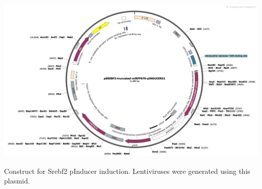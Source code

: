 \begin{suppfigure}[p]  
    \centering
    \includegraphics[width=\linewidth]{figures/hedgehog/SuppFigure14.png}
    \caption[Plasmid design for Srebf2 lentiviral transduction]{
        Construct for Srebf2 pInducer induction. Lentiviruses were generated using this plasmid.  
    }
    \label{fig:hh_figureS14}
\end{suppfigure}


